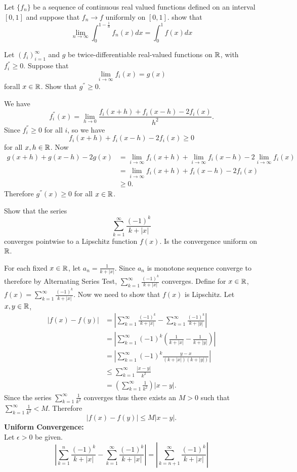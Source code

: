 \question Let $\{f_n\}$ be a sequence of continuous real valued functions defined on an interval $[0,1]$ and suppose that $f_n\to f$ uniformly on $[0,1]$. show that
$$\lim_{n\to\infty}\int_{0}^{1-\frac{1}{n}}{f_n(x)dx}=\int_{0}^{1}{f(x)dx}$$

\question[2B, Sp16] Let $(f_i)_{i=1}^{\infty}$ and $g$ be twice-differentiable real-valued functions on $\mathbb{R}$, with $f_{i}^{''}\geq 0$. Suppose that
$$\lim_{i\to\infty}{f_i(x)}=g(x)$$
forall $x\in\mathbb{R}$. Show that $g^{''}\geq0$.

\begin{solution}
    We have $$f^{''}_{i}(x)=\lim_{h\to0}{\frac{f_i(x+h)+f_i(x-h)-2f_i(x)}{h^2}}.$$
    Since $f_{i}^{''}\geq 0$ for all $i$, so we have
    $$f_i(x+h)+f_i(x-h)-2f_i(x)\geq 0$$
    for all $x,h\in\mathbb{R}$. Now
    \begin{align*}
        g(x+h)+g(x-h)-2g(x)&=\lim_{i\to\infty}{f_i(x+h)}+\lim_{i\to\infty}{f_i(x-h)}-2\lim_{i\to\infty}{f_i(x)}\\
        &=\lim_{i\to\infty}{f_i(x+h)+f_i(x-h)-2f_i(x)}\\
        &\geq0.
    \end{align*}
    Therefore $g^{''}(x)\geq 0$ for all $x\in\mathbb{R}$.
\end{solution}

\question[3B, Sp16] Show that the series $$\sum_{k=1}^{\infty}{\frac{(-1)^k}{k+|x|}}$$ converges pointwise to a Lipschitz function $f(x)$. Is the convergence uniform on $\mathbb{R}$.
\begin{solution}
    For each fixed $x\in\mathbb{R}$, let $a_n=\frac{1}{k+|x|}$. Since $a_n$ is monotone sequence converge to therefore by Alternating Series Test, $\sum_{k=1}^{\infty}{\frac{(-1)^k}{k+|x|}}$ converges. Define for $x\in\mathbb{R}$, $f(x)=\sum_{k=1}^{\infty}{\frac{(-1)^k}{k+|x|}}$. Now we need to show that $f(x)$ is Lipschitz. Let $x,y\in\mathbb{R}$,
    \begin{align*}
        |f(x)-f(y)|&=\left|\sum_{k=1}^{\infty}{\frac{(-1)^k}{k+|x|}}-\sum_{k=1}^{\infty}{\frac{(-1)^k}{k+|y|}}\right|\\
        &=\left|\sum_{k=1}^{\infty}{(-1)^k\left(\frac{1}{k+|x|}-\frac{1}{k+|y|}\right)}\right|\\
        &=\left|\sum_{k=1}^{\infty}{(-1)^k\frac{y-x}{(k+|x|)(k+|y|)}}\right|\\
        &\leq\sum_{k=1}^{\infty}{\frac{|x-y|}{k^2}}\\
        &=\left(\sum_{k=1}^{\infty}{\frac{1}{k^2}}\right)|x-y|.
    \end{align*}
    Since the series $\sum_{k=1}^{\infty}{\frac{1}{k^2}}$ converges thus there exists an $M>0$ such that $\sum_{k=1}^{\infty}{\frac{1}{k^2}}<M$. Therefore
    $$|f(x)-f(y)|\leq M|x-y|.$$
    \textbf{Uniform Convergence:}\\
    Let $\epsilon>0$ be given.
    $$\left|\sum_{k=1}^{n}{\frac{(-1)^k}{k+|x|}}-\sum_{k=1}^{\infty}{\frac{(-1)^k}{k+|x|}}\right|=\left|\sum_{k=n+1}^{\infty}{\frac{(-1)^k}{k+|x|}}\right|$$
\end{solution}

